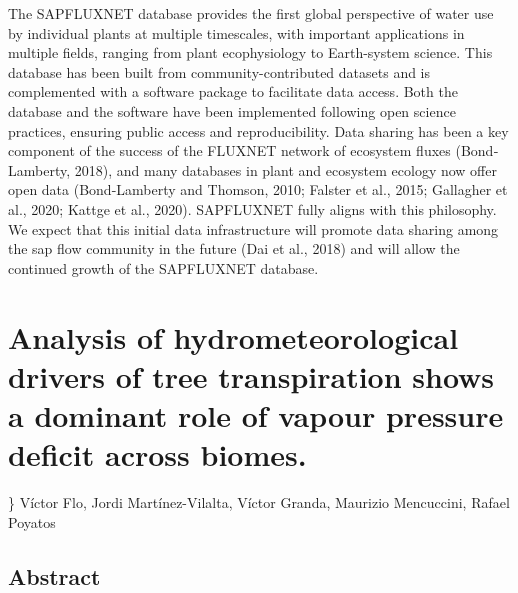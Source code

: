 \documentclass[11pt,twoside]{reedthesis}
\begin{document}
The SAPFLUXNET database provides the first global perspective of water
use by individual plants at multiple timescales, with important
applications in multiple fields, ranging from plant ecophysiology to
Earth-system science. This database has been built from
community-contributed datasets and is complemented with a software
package to facilitate data access. Both the database and the software
have been implemented following open science practices, ensuring public
access and reproducibility. Data sharing has been a key component of the
success of the FLUXNET network of ecosystem fluxes (Bond‐Lamberty,
2018), and many databases in plant and ecosystem ecology now offer open
data (Bond-Lamberty and Thomson, 2010; Falster et al., 2015; Gallagher
et al., 2020; Kattge et al., 2020). SAPFLUXNET fully aligns with this
philosophy. We expect that this initial data infrastructure will promote
data sharing among the sap flow community in the future (Dai et al.,
2018) and will allow the continued growth of the SAPFLUXNET database.

\chapter[Analysis of hydrometeorological drivers.]{Analysis of hydrometeorological drivers of tree transpiration shows a dominant role of vapour pressure deficit across biomes.}

\} \setlength{\parindent}{0pt} Víctor Flo, Jordi Martínez-Vilalta,
Víctor Granda, Maurizio Mencuccini, Rafael Poyatos \newpage
\setlength{\parindent}{30pt}

\section*{Abstract}
\end{document}
